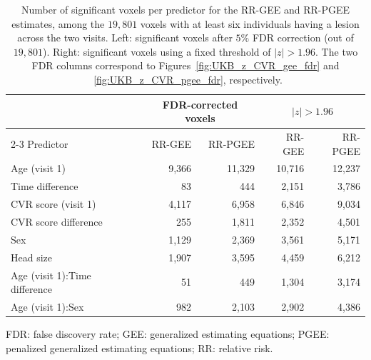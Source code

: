 \begin{table}[htbp]
\centering
\caption{Number of significant voxels per predictor for the RR-GEE and RR-PGEE estimates, among the $19,801$ voxels with at least six individuals having a lesion across the two visits. Left: significant voxels after $5\%$ FDR correction (out of $19,801$). Right: significant voxels using a fixed threshold of $\vert z \vert > 1.96$. The two FDR columns correspond to Figures~\ref{fig:UKB_z_CVR_gee_fdr} and ~\ref{fig:UKB_z_CVR_pgee_fdr}, respectively.}
\label{tab:significant-voxels}
\setlength{\tabcolsep}{7pt}
\renewcommand{\arraystretch}{1.15}
\begin{tabular}{lrrrr}
\hline
& \multicolumn{2}{c}{FDR-corrected voxels} & \multicolumn{2}{c}{$|z| > 1.96$} \\
\cline{2-3}\cline{4-5}
Predictor & RR-GEE & RR-PGEE & RR-GEE & RR-PGEE \\
\hline
Age (visit 1) & 9,366 & 11,329 & 10,716 & 12,237 \\
Time difference & 83 & 444 & 2,151 & 3,786 \\
CVR score (visit 1) & 4,117 & 6,958 & 6,846 & 9,034 \\
CVR score difference & 255 & 1,811 & 2,352 & 4,501 \\
Sex & 1,129 & 2,369 & 3,561 & 5,171 \\
Head size & 1,907 & 3,595 & 4,459 & 6,212 \\
Age (visit 1):Time difference & 51 & 449 & 1,304 & 3,174 \\
Age (visit 1):Sex & 982 & 2,103 & 2,902 & 4,386 \\
\hline
\end{tabular}

\vspace{0.4em}
\begin{minipage}{0.94\linewidth}
\footnotesize
FDR: false discovery rate; GEE: generalized estimating equations; PGEE: penalized generalized estimating equations; RR: relative risk.
\end{minipage}
\end{table}
